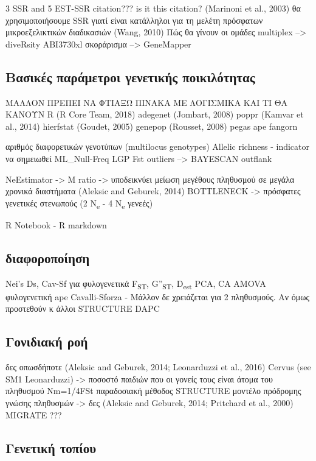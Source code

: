 \documentclass[12pt,a4paper,]{report}
\begin{document}
3 SSR and 5 EST-SSR citation??? is it this citation? (Marinoni et al.,
2003) θα χρησιμοποιήσουμε SSR γιατί είναι κατάλληλοι για τη μελέτη
πρόσφατων μικροεξελικτικών διαδικασιών (Wang, 2010) Πώς θα γίνουν οι
ομάδες multiplex --\textgreater{} diveRsity ABI3730xl σκοράρισμα
--\textgreater{} GeneMapper

\hypertarget{---}{%
\subsection{Βασικές παράμετροι γενετικής ποικιλότητας}\label{---}}

ΜΑΛΛΟΝ ΠΡΕΠΕΙ ΝΑ ΦΤΙΑΞΩ ΠΙΝΑΚΑ ΜΕ ΛΟΓΙΣΜΙΚΑ ΚΑΙ ΤΙ ΘΑ ΚΑΝΟΥΝ R (R Core
Team, 2018) adegenet (Jombart, 2008) poppr (Kamvar et al., 2014)
hierfstat (Goudet, 2005) genepop (Rousset, 2008) pegas ape fangorn

αριθμός διαφορετικών γενοτύπων (multilocus genotypes) Allelic richness -
indicator να σημειωθεί ML\_Null-Freq LGP Fst outliers --\textgreater{}
BAYESCAN outflank

NeEstimator -\textgreater{} M ratio -\textgreater{} υποδεικνύει μείωση
μεγέθους πληθυσμού σε μεγάλα χρονικά διαστήματα (Aleksic and Geburek,
2014) BOTTLENECK -\textgreater{} πρόσφατες γενετικές στενωπούς (2
N\textsubscript{e} - 4 N\textsubscript{e} γενεές)

R Notebook - R markdown

\subsection{διαφοροποίηση}

Nei's Ds, Cav-Sf για φυλογενετικά F\textsubscript{ST},
G''\textsubscript{ST}, D\textsubscript{est} PCA, CA AMOVA φυλογενετική
ape Cavalli-Sforza - Μάλλον δε χρειάζεται για 2 πληθυσμούς. Αν όμως
προστεθούν κ άλλοι STRUCTURE DAPC

\hypertarget{-}{%
\subsection{Γονιδιακή ροή}\label{-}}

δες οπωσδήποτε (Aleksic and Geburek, 2014; Leonarduzzi et al., 2016)
Cervus (see SM1 Leonarduzzi) -\textgreater{} ποσοστό παιδιών που οι
γονείς τους είναι άτομα του πληθυσμού Nm=1/4FSt παραδοσιακή μέθοδος
STRUCTURE μοντέλο πρόδρομης γνώσης πληθυσμών -\textgreater{} δες
(Aleksic and Geburek, 2014; Pritchard et al., 2000) MIGRATE ???

\hypertarget{-}{%
\subsection{Γενετική τοπίου}\label{-}}
\end{document}
